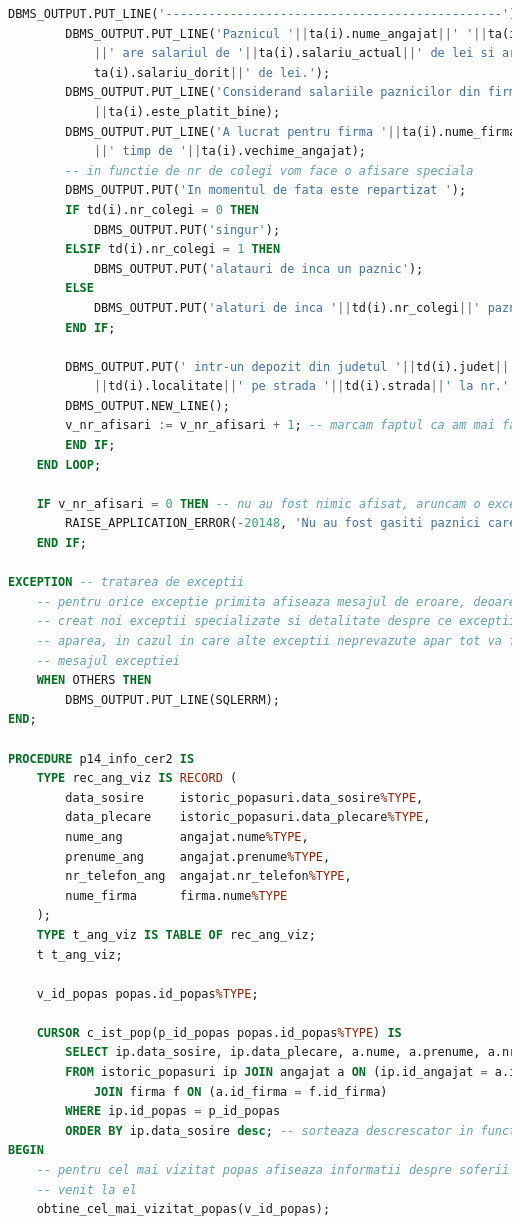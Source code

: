 \documentclass[12pt, a4paper]{article}
\begin{document}
\begin{lstlisting}[language=SQL]
        DBMS_OUTPUT.PUT_LINE('-----------------------------------------------');
        DBMS_OUTPUT.PUT_LINE('Paznicul '||ta(i).nume_angajat||' '||ta(i).prenume_angajat
            ||' are salariul de '||ta(i).salariu_actual||' de lei si ar dori '||
            ta(i).salariu_dorit||' de lei.');
        DBMS_OUTPUT.PUT_LINE('Considerand salariile paznicilor din firma este '
            ||ta(i).este_platit_bine);
        DBMS_OUTPUT.PUT_LINE('A lucrat pentru firma '||ta(i).nume_firma
            ||' timp de '||ta(i).vechime_angajat);
        -- in functie de nr de colegi vom face o afisare speciala
        DBMS_OUTPUT.PUT('In momentul de fata este repartizat ');
        IF td(i).nr_colegi = 0 THEN
            DBMS_OUTPUT.PUT('singur');
        ELSIF td(i).nr_colegi = 1 THEN
            DBMS_OUTPUT.PUT('alatauri de inca un paznic');
        ELSE
            DBMS_OUTPUT.PUT('alaturi de inca '||td(i).nr_colegi||' paznici');
        END IF;
            
        DBMS_OUTPUT.PUT(' intr-un depozit din judetul '||td(i).judet||' localiatea '
            ||td(i).localitate||' pe strada '||td(i).strada||' la nr.'||td(i).nr);
        DBMS_OUTPUT.NEW_LINE();
        v_nr_afisari := v_nr_afisari + 1; -- marcam faptul ca am mai facut o afisare
        END IF;
    END LOOP;
    
    IF v_nr_afisari = 0 THEN -- nu au fost nimic afisat, aruncam o exceptie
        RAISE_APPLICATION_ERROR(-20148, 'Nu au fost gasiti paznici care sa respecte criteriile date');
    END IF;
    
EXCEPTION -- tratarea de exceptii
    -- pentru orice exceptie primita afiseaza mesajul de eroare, deoarece am
    -- creat noi exceptii specializate si detalitate despre ce exceptii ar putea
    -- aparea, in cazul in care alte exceptii neprevazute apar tot va fi afisat
    -- mesajul exceptiei
    WHEN OTHERS THEN
        DBMS_OUTPUT.PUT_LINE(SQLERRM);
END;

PROCEDURE p14_info_cer2 IS
    TYPE rec_ang_viz IS RECORD (
        data_sosire     istoric_popasuri.data_sosire%TYPE,
        data_plecare    istoric_popasuri.data_plecare%TYPE,
        nume_ang        angajat.nume%TYPE,
        prenume_ang     angajat.prenume%TYPE,
        nr_telefon_ang  angajat.nr_telefon%TYPE,
        nume_firma      firma.nume%TYPE
    );
    TYPE t_ang_viz IS TABLE OF rec_ang_viz;
    t t_ang_viz;

    v_id_popas popas.id_popas%TYPE;
    
    CURSOR c_ist_pop(p_id_popas popas.id_popas%TYPE) IS 
        SELECT ip.data_sosire, ip.data_plecare, a.nume, a.prenume, a.nr_telefon, f.nume
        FROM istoric_popasuri ip JOIN angajat a ON (ip.id_angajat = a.id_angajat)
            JOIN firma f ON (a.id_firma = f.id_firma)
        WHERE ip.id_popas = p_id_popas
        ORDER BY ip.data_sosire desc; -- sorteaza descrescator in functie de cand au venit
BEGIN
    -- pentru cel mai vizitat popas afiseaza informatii despre soferii care au 
    -- venit la el
    obtine_cel_mai_vizitat_popas(v_id_popas);
    

\end{lstlisting}
\end{document}

